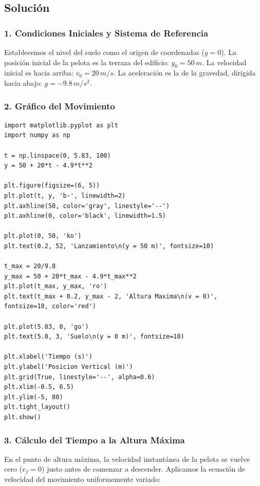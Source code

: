 \documentclass[12pt, a4paper]{article}
\begin{document}
\subsection*{Solución}

\subsubsection*{1. Condiciones Iniciales y Sistema de Referencia}
Establecemos el nivel del suelo como el origen de coordenadas ($y = 0$).
La posición inicial de la pelota es la terraza del edificio: $y_0 = 50 \, \si{m}$.
La velocidad inicial es hacia arriba: $v_0 = 20 \, \si{m/s}$.
La aceleración es la de la gravedad, dirigida hacia abajo: $g = -9.8 \, \si{m/s^2}$.

\subsubsection*{2. Gráfico del Movimiento}
\begin{lstlisting}
import matplotlib.pyplot as plt
import numpy as np

t = np.linspace(0, 5.83, 100)
y = 50 + 20*t - 4.9*t**2

plt.figure(figsize=(6, 5))
plt.plot(t, y, 'b-', linewidth=2)
plt.axhline(50, color='gray', linestyle='--')
plt.axhline(0, color='black', linewidth=1.5)

plt.plot(0, 50, 'ko')
plt.text(0.2, 52, 'Lanzamiento\n(y = 50 m)', fontsize=10)

t_max = 20/9.8
y_max = 50 + 20*t_max - 4.9*t_max**2
plt.plot(t_max, y_max, 'ro')
plt.text(t_max + 0.2, y_max - 2, 'Altura Maxima\n(v = 0)', fontsize=10, color='red')

plt.plot(5.83, 0, 'go')
plt.text(5.0, 3, 'Suelo\n(y = 0 m)', fontsize=10)

plt.xlabel('Tiempo (s)')
plt.ylabel('Posicion Vertical (m)')
plt.grid(True, linestyle='--', alpha=0.6)
plt.xlim(-0.5, 6.5)
plt.ylim(-5, 80)
plt.tight_layout()
plt.show()
\end{lstlisting}

\subsubsection*{3. Cálculo del Tiempo a la Altura Máxima}
En el punto de altura máxima, la velocidad instantánea de la pelota se vuelve cero ($v_f = 0$) justo antes de comenzar a descender. Aplicamos la ecuación de velocidad del movimiento uniformemente variado:
\end{document}
